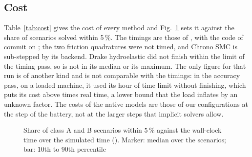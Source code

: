 \subsection{Cost}\label{sup:cost}

Table~\ref{tab:cost} gives the cost of every method and Fig.~\ref{fig:work-precision} sets it
against the share of scenarios solved within 5\,\%. The timings are those of
, with the code of commit  on
; the two friction quadratures were not timed, and Chrono SMC is
sub-stepped by its backend. Drake hydroelastic did not finish  within the limit of
the timing pass, so  is not in its median or its maximum. The only figure for that
run is of another kind and is not comparable with the timings: in the accuracy pass, on a
loaded machine, it used its hour of time limit without finishing, which puts its cost above
 times real time, a lower bound that the load inflates by an
unknown factor. The costs of the native models are those of our configurations at the step of
the battery, not at the larger steps that implicit solvers allow.

\begin{table}[!htbp]
\caption{Wall-clock time over simulated time across the scenarios, base variant
(). Runs: scenarios timed; Drake hydroelastic did not finish }
\label{tab:cost}
\end{table}

\begin{figure}[!htbp]
\centering
{}
\caption{Share of class A and B scenarios within 5\,\% against the wall-clock time over the
simulated time (). Marker: median over the scenarios; bar: 10th to 90th
percentile}
\label{fig:work-precision}
\end{figure}

